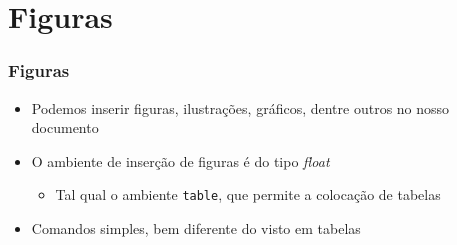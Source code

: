 \section{Figuras}

\begin{frame}[fragile] \frametitle{Figuras}
\begin{itemize}
	\item Podemos inserir figuras, ilustrações, gráficos, dentre outros no nosso documento
	\item O ambiente de inserção de figuras é do tipo \textit{float}
	\begin{itemize}
		\item Tal qual o ambiente \texttt{table}, que permite a colocação de tabelas
	\end{itemize}
	\item Comandos simples, bem diferente do visto em tabelas
\end{itemize}
\end{frame}

